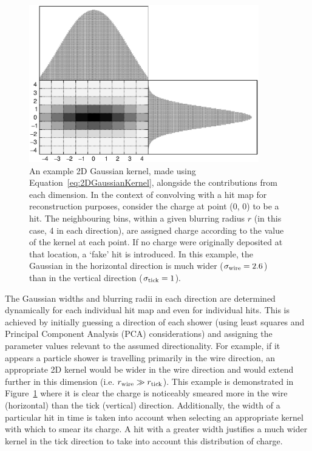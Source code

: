 \begin{figure}
  \centering
  \includegraphics[width=10cm]{2DGaussianKernel.eps}
  \caption[An example 2D Gaussian kernel alongside the contributions from each dimension.]{An example 2D Gaussian kernel, made using Equation~\ref{eq:2DGaussianKernel}, alongside the contributions from each dimension.  In the context of convolving with a hit map for reconstruction purposes, consider the charge at point (0, 0) to be a hit.  The neighbouring bins, within a given blurring radius $r$ (in this case, 4 in each direction), are assigned charge according to the value of the kernel at each point.  If no charge were originally deposited at that location, a `fake' hit is introduced.  In this example, the Gaussian in the horizontal direction is much wider ($\sigma_{\textnormal{wire}}=2.6$) than in the vertical direction ($\sigma_{\textnormal{tick}}=1$).}
  \label{fig:2DGaussianKernel}
\end{figure}

The Gaussian widths and blurring radii in each direction are determined dynamically for each individual hit map and even for individual hits.  This is achieved by initially guessing a direction of each shower (using least squares and Principal Component Analysis (PCA) considerations) and assigning the parameter values relevant to the assumed directionality.  For example, if it appears a particle shower is travelling primarily in the wire direction, an appropriate 2D kernel would be wider in the wire direction and would extend further in this dimension (i.e. $r_{\textnormal{wire}} \gg r_{\textnormal{tick}}$).  This example is demonstrated in Figure~\ref{fig:2DGaussianKernel} where it is clear the charge is noticeably smeared more in the wire (horizontal) than the tick (vertical) direction.  Additionally, the width of a particular hit in time is taken into account when selecting an appropriate kernel with which to smear its charge.  A hit with a greater width justifies a much wider kernel in the tick direction to take into account this distribution of charge.

